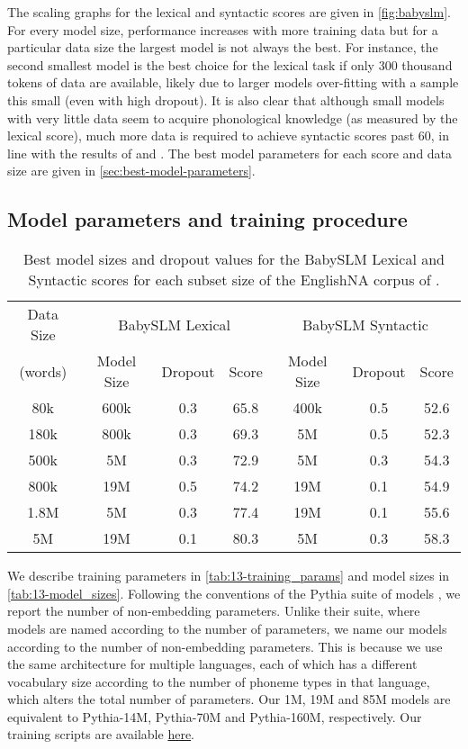 The scaling graphs for the lexical and syntactic scores are given in \cref{fig:babyslm}. For every model size, performance increases with more training data but for a particular data size the largest model is not always the best. For instance, the second smallest model is the best choice for the lexical task if only 300 thousand tokens of data are available, likely due to larger models over-fitting with a sample this small (even with high dropout). It is also clear that although small models with very little data seem to acquire phonological knowledge (as measured by the lexical score), much more data is required to achieve syntactic scores past 60, in line with the results of \citet{lavechin} and \citet{goriely2024babble}. The best model parameters for each score and data size are given in \cref{sec:best-model-parameters}.

\subsection{Model parameters and training procedure}

\begin{table}[t!]
    \centering
    \small
    \begin{tabular}{c|ccc|ccc}
    \toprule
         Data Size& \multicolumn{3}{c|}{BabySLM Lexical} & \multicolumn{3}{c}{BabySLM Syntactic} \\
         (words) & Model Size & Dropout & Score & Model Size & Dropout & Score \\
         \midrule
         80k & 600k & 0.3 & 65.8 & 400k & 0.5 & 52.6 \\ 
         180k & 800k & 0.3 & 69.3 & 5M & 0.5 & 52.3\\ 
         500k & 5M & 0.3 & 72.9 & 5M & 0.3 & 54.3\\ 
         800k & 19M & 0.5 & 74.2 & 19M & 0.1 & 54.9 \\ 
         1.8M & 5M & 0.3 & 77.4 & 19M & 0.1 & 55.6 \\ 
         5M & 19M & 0.1 & 80.3 & 5M & 0.3 & 58.3 \\ 
    \bottomrule
    \end{tabular}
    \caption{Best model sizes and dropout values for the BabySLM Lexical and Syntactic scores for each subset size of the EnglishNA corpus of \ipachildes.}
    \label{tab:13-best_sizes}
\end{table}

We describe training parameters in \cref{tab:13-training_params} and model sizes in \cref{tab:13-model_sizes}. Following the conventions of the Pythia suite of models \citep{biderman2023pythia}, we report the number of non-embedding parameters. Unlike their suite, where models are named according to the number of parameters, we name our models according to the number of non-embedding parameters. This is because we use the same architecture for multiple languages, each of which has a different vocabulary size according to the number of phoneme types in that language, which alters the total number of parameters. Our 1M, 19M and 85M models are equivalent to Pythia-14M, Pythia-70M and Pythia-160M, respectively. Our training scripts are available \href{https://github.com/codebyzeb/PhonemeTransformers}{here}.

